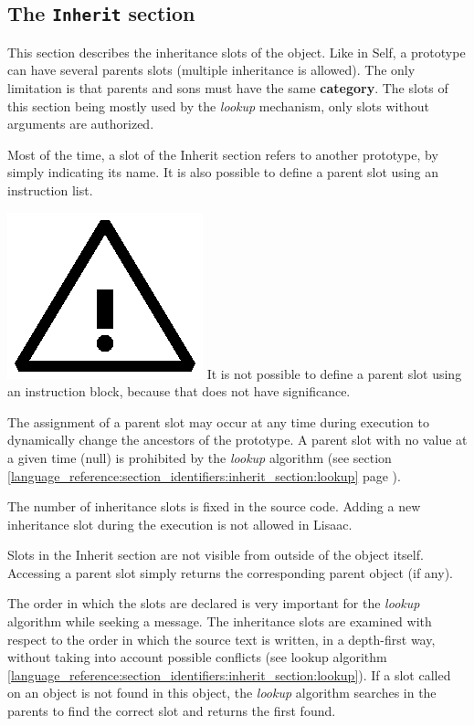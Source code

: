 \documentclass[11pt]{mybook}
\newcommand{\warning}{\includegraphics[scale=0.3]{figures/warning}}
\begin{document}
\subsection{The {\tt{}Inherit} section}
\label{language_reference:section_identifiers:inherit_section}
%
This section describes the inheritance slots of the object.
Like in Self, a prototype can have several parents slots (multiple 
inheritance is allowed). The only limitation is that parents and sons must have the same {\bf{}category}.
The slots of this section being mostly used by the {\it{}lookup}
mechanism, only slots without arguments are authorized.

Most of the time, a slot of the Inherit section refers to  
another prototype, by simply indicating its name.
It is also possible to define a parent slot using an instruction
list.

\warning{} It is not possible to define a parent slot using an 
instruction block, because that does not have significance.

The assignment of a parent slot may occur at any time during execution
to dynamically change the ancestors of the prototype.
A parent slot with no value at a given time ({\sc{}null}) is prohibited
by the {\it{}lookup} algorithm (see section \ref{language_reference:section_identifiers:inherit_section:lookup}
page \pageref{language_reference:section_identifiers:inherit_section:lookup}). 

The number of inheritance slots is fixed in the source code.
Adding a new inheritance slot during the execution is not allowed 
in Lisaac.

Slots in the Inherit section are not visible from outside 
of the object itself.
Accessing a parent slot simply returns the corresponding parent 
object (if any).

The order in which the slots are declared is very important for
the {\it{}lookup} algorithm while seeking a message.
The inheritance slots are examined with respect to the order in which
the source text is written, in a depth-first way,
without taking into account possible conflicts (see lookup algorithm \ref{language_reference:section_identifiers:inherit_section:lookup}). 
If a slot called on an object is not found in this object, the {\it{}lookup} algorithm searches in the parents to find the correct slot and returns the first found.
\end{document}
